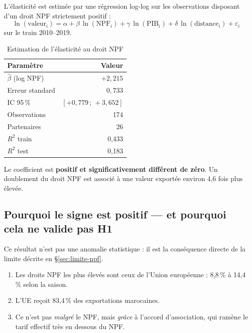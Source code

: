 \documentclass[11pt,a4paper]{article}
\begin{document}
L'élasticité est estimée par une régression log-log sur les observations disposant
d'un droit NPF strictement positif :
\begin{equation}
\ln(\text{valeur}_i) = \alpha + \beta\,\ln(\text{NPF}_i)
+ \gamma\,\ln(\text{PIB}_i) + \delta\,\ln(\text{distance}_i) + \varepsilon_i
\end{equation}
sur le train 2010--2019.

\begin{table}[H]
\centering
\caption{Estimation de l'élasticité au droit NPF}\label{tab:elasticite}
\begin{tabular}{lr}
\toprule
\textbf{Paramètre} & \textbf{Valeur} \\
\midrule
$\hat{\beta}$ (log NPF) & $+2{,}215$ \\
Erreur standard & $0{,}733$ \\
IC 95\,\% & $[+0{,}779\,;\,+3{,}652]$ \\
Observations & 174 \\
Partenaires & 26 \\
$R^2$ train & 0,433 \\
$R^2$ test & 0,183 \\
\bottomrule
\end{tabular}
\end{table}

Le coefficient est \textbf{positif et significativement différent de zéro}. Un
doublement du droit NPF est associé à une valeur exportée environ 4,6 fois plus
élevée.

\subsection{Pourquoi le signe est positif — et pourquoi cela ne valide pas H1}

Ce résultat n'est pas une anomalie statistique : il est la conséquence directe de la
limite décrite en §\ref{sec:limite-npf}.

\begin{enumerate}[leftmargin=1.2cm]
    \item Les droits NPF les plus élevés sont ceux de l'Union européenne : 8,8\,\% à
          14,4\,\% selon la saison.
    \item L'UE reçoit 83,4\,\% des exportations marocaines.
    \item Ce n'est pas \emph{malgré} le NPF, mais \emph{grâce} à l'accord
          d'association, qui ramène le tarif effectif très en dessous du NPF.
\end{enumerate}
\end{document}
